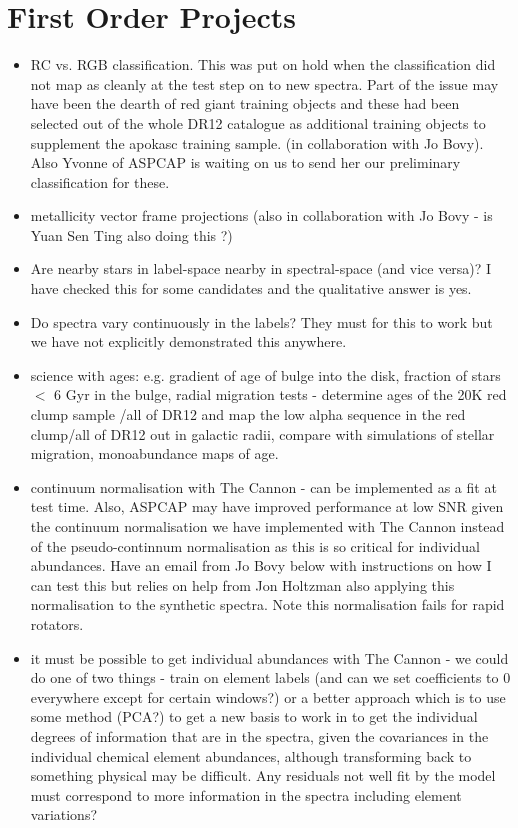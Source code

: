 \documentclass[11pt]{amsart}
\begin{document}
\section{First Order Projects}
\begin{itemize}
\item RC vs. RGB classification.
This was put on hold when the classification did not map as cleanly at the test step on to new spectra. Part of the issue may have been the dearth of red giant training objects and these had been selected out of the whole DR12 catalogue as additional training objects to supplement the apokasc training sample. (in collaboration with Jo Bovy). Also Yvonne of ASPCAP is waiting on us to send her our preliminary classification for these. 
\item metallicity vector frame projections (also in collaboration with Jo Bovy - is Yuan Sen Ting also doing this ?)
\item Are nearby stars in label-space nearby in spectral-space (and vice versa)?
I have checked this for some candidates and the qualitative answer is yes. 
\item Do spectra vary continuously in the labels?
They must for this to work but we have not explicitly demonstrated this anywhere.
\item science with ages: e.g. gradient of age of bulge into the disk, fraction of stars $<$ 6 Gyr in the bulge, radial migration tests - determine ages of the 20K red clump sample /all of DR12 and map the low alpha sequence in the red clump/all of DR12 out in galactic radii, compare with simulations of stellar migration, monoabundance maps of age. 
\item continuum normalisation with The Cannon - can be implemented as a fit at test time. Also, ASPCAP may have improved performance at low SNR given the continuum normalisation we have implemented with The Cannon instead of the pseudo-continnum normalisation as this is so critical for individual abundances. Have an email from Jo Bovy below with instructions on how I can test this but relies on help from Jon Holtzman also applying this normalisation to the synthetic spectra. Note this normalisation fails for rapid rotators. \\
\item it must be possible to get individual abundances with The Cannon - we could do one of two things - train on element labels  (and can we set coefficients  to 0 everywhere except for certain windows?) or a better approach which is to use some method (PCA?) to get a new basis to work in to get the individual degrees of information that are in the spectra, given the covariances in the individual chemical element abundances, although transforming back to something physical may be difficult. Any residuals not well fit by the model must correspond to more information in the spectra including element variations? 
\end{itemize} 
\end{document}
